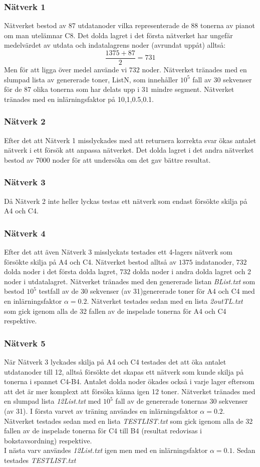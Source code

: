 \documentclass[a4paper,10pt]{article}
\begin{document}
\subsubsection{Nätverk 1}
Nätverket bestod av 87 utdatanoder vilka representerade de 88 tonerna av pianot om man utelämnar C8. 
Det dolda lagret i det första nätverket har ungefär medelvärdet av utdata och indatalagrens noder (avrundat uppåt) alltså: \[\dfrac{1375+87}{2}=731\] Men för att ligga över medel använde vi $732$ noder. Nätverket tränades med en slumpad lista av genererade toner, ListN, som innehåller $10^5$ fall av 30 sekvenser för de 87 olika tonerna som har delats upp i $31$ mindre segment. Nätverket tränades med en inlärningsfaktor på 10,1,0.5,0.1. 
\subsubsection{Nätverk 2}
Efter det att Nätverk 1 misslyckades med att returnera korrekta svar ökas antalet nätverk i ett försök att anpassa nätverket. Det dolda lagret i det andra nätverket bestod av 7000 noder för att undersöka om det gav bättre resultat. 
\subsubsection{Nätverk 3}
Då Nätverk 2 inte heller lyckas testas ett nätverk som endast försökte skilja på A4 och C4. 
\subsubsection{Nätverk 4}
Efter det att även Nätverk 3 misslyckats testades ett 4-lagers nätverk som försökte skilja på A4 och C4. Nätverket bestod alltså av $1375$ indatanoder, $732$ dolda noder i det första dolda lagret, $732$ dolda noder i andra dolda lagret och 2 noder i utdatalagret. Nätverket tränades med den genererade listan \emph{BList.txt} som bestod $10^5$ testfall av de 30 sekvenser (av 31)genererade toner för A4 och C4 med en inlärningsfaktor $\alpha=0.2$. Nätverket testades sedan med en lista \emph{2outTL.txt} som gick igenom alla de 32 fallen av de inspelade tonerna för A4 och C4 respektive.
\subsubsection{Nätverk 5}
När Nätverk 3 lyckades skilja på A4 och C4 testades det att öka antalet utdatanoder till 12, alltså försökte det skapas ett nätverk som kunde skilja på tonerna i spannet C4-B4. Antalet dolda noder ökades också i varje lager eftersom att det är mer komplext att försöka känna igen 12 toner. Nätverket tränades med en slumpad lista \emph{12List.txt} med $10^5$ fall av de genererade tonernas 30 sekvenser (av 31). I första varvet av träning användes en inlärningsfaktor $\alpha=0.2$. Nätverket testades sedan med en lista \emph{TESTLIST.txt} som gick igenom alla de 32 fallen av de inspelade tonerna för C4 till B4 (resultat redovisas i bokstavsordning) respektive. \\I nästa varv användes \emph{12List.txt} igen men med en inlärningsfaktor $\alpha=0.1$. Sedan testades \emph{TESTLIST.txt}
\end{document}
